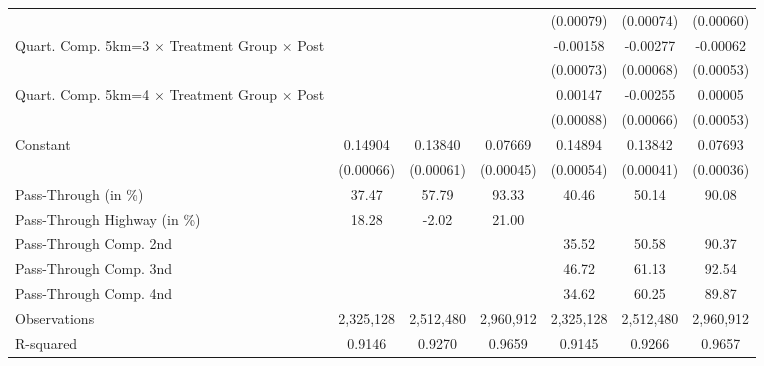 {\begin{tabular}{l*{6}{c}}
                    &                     &                     &                     &   (0.00079)         &   (0.00074)         &   (0.00060)         \\
Quart. Comp. 5km=3 $\times$ Treatment Group $\times$ Post&                     &                     &                     &    -0.00158\sym{**} &    -0.00277\sym{***}&    -0.00062         \\
                    &                     &                     &                     &   (0.00073)         &   (0.00068)         &   (0.00053)         \\
Quart. Comp. 5km=4 $\times$ Treatment Group $\times$ Post&                     &                     &                     &     0.00147\sym{*}  &    -0.00255\sym{***}&     0.00005         \\
                    &                     &                     &                     &   (0.00088)         &   (0.00066)         &   (0.00053)         \\
Constant            &     0.14904\sym{***}&     0.13840\sym{***}&     0.07669\sym{***}&     0.14894\sym{***}&     0.13842\sym{***}&     0.07693\sym{***}\\
                    &   (0.00066)         &   (0.00061)         &   (0.00045)         &   (0.00054)         &   (0.00041)         &   (0.00036)         \\
\midrule
Pass-Through (in \%)&       37.47         &       57.79         &       93.33         &       40.46         &       50.14         &       90.08         \\
Pass-Through Highway (in \%)&       18.28         &       -2.02         &       21.00         &                     &                     &                     \\
Pass-Through Comp. 2nd&                     &                     &                     &       35.52         &       50.58         &       90.37         \\
Pass-Through Comp. 3nd&                     &                     &                     &       46.72         &       61.13         &       92.54         \\
Pass-Through Comp. 4nd&                     &                     &                     &       34.62         &       60.25         &       89.87         \\
Observations        &   2,325,128         &   2,512,480         &   2,960,912         &   2,325,128         &   2,512,480         &   2,960,912         \\
R-squared           &      0.9146         &      0.9270         &      0.9659         &      0.9145         &      0.9266         &      0.9657         \\
\bottomrule
\end{tabular}
}
